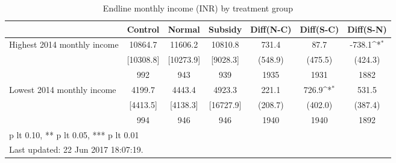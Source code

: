 \begin{table}[htbp]\centering
\def\sym#1{\ifmmode^{#1}\else\(^{#1}\)\fi}
\caption{Endline monthly income (INR) by treatment group \label{tab:"balance"}}
\begin{tabular*}{1\hsize}{@{\hskip\tabcolsep\extracolsep\fill}l*{1}{cccccc}}
\toprule
                                &  Control&   Normal&  Subsidy&Diff(N-C)         &Diff(S-C)         &Diff(S-N)         \\
\midrule
Highest 2014 monthly income     &  10864.7&  11606.2&  10810.8&    731.4         &     87.7         &   -738.1\sym{*}  \\
                                &[10308.8]&[10273.9]& [9028.3]&  (548.9)         &  (475.5)         &  (424.3)         \\
                                &      992&      943&      939&     1935         &     1931         &     1882         \\
Lowest 2014 monthly income      &   4199.7&   4443.4&   4923.3&    221.1         &    726.9\sym{*}  &    531.5         \\
                                & [4413.5]& [4138.3]&[16727.9]&  (208.7)         &  (402.0)         &  (387.4)         \\
                                &      994&      946&      946&     1940         &     1940         &     1892         \\
\bottomrule
\multicolumn{7}{l}{\footnotesize * p lt 0.10, ** p lt 0.05, *** p lt 0.01}\\
\multicolumn{7}{l}{\footnotesize Last updated: 22 Jun 2017 18:07:19.}\\
\end{tabular*}
\end{table}
